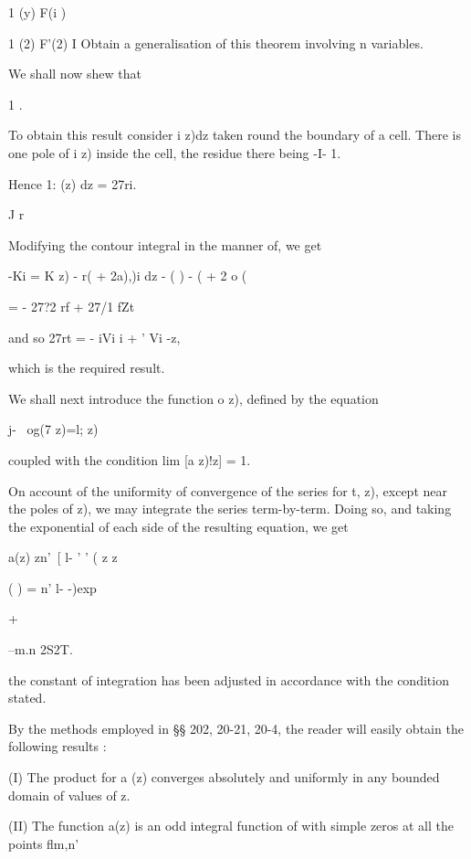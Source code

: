 {1 (y) F(i )

1 (2) F'(2) I Obtain a generalisation of this theorem involving n
variables.



We shall now shew that

1 .

To obtain this result consider i z)dz taken round the boundary of a
cell. There is one pole of i z) inside the cell, the residue there
being -I- 1.

Hence 1: (z) dz = 27ri.

J r

%
%

Modifying the contour integral in the manner of, we get

 -Ki = K z) - r( + 2a),)i dz - ( ) - ( + 2 o (

= - 27?2 rf + 27/1 fZt

and so 27rt = - iVi i + ' Vi -z,

which is the required result.


We shall next introduce the function o z), defined by the equation

j- \ og(7 z)=l; z)

coupled with the condition lim [a z)!z] = 1.

On account of the uniformity of convergence of the series for t, z),
except near the poles of z), we may integrate the series term-by-term.
Doing so, and taking the exponential of each side of the resulting
equation, we get

a(z) zn'\ [ l- ' ' ( z z

( ) = n' l- -)exp

+

--m.n 2S2T.

the constant of integration has been adjusted in accordance with the
condition stated.

By the methods employed in §§ 202, 20-21, 20-4, the reader will easily
obtain the following results :

(I) The product for a (z) converges absolutely and uniformly in any
bounded domain of values of z.

(II) The function a(z) is an odd integral function of with simple
zeros at all the points flm,n'

}

